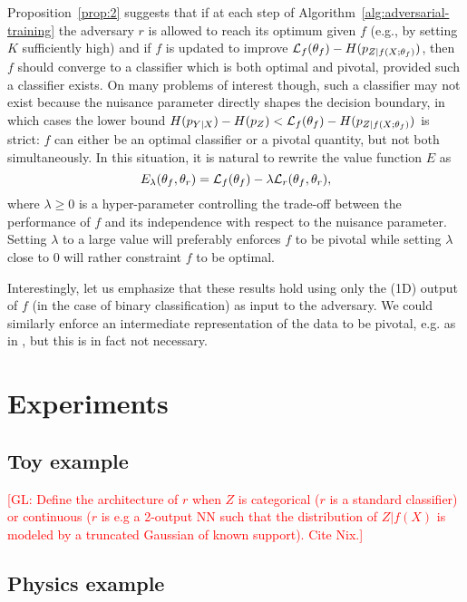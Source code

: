 \documentclass[twocolumn,superscriptaddress,aps]{revtex4-1}
\newcommand{\glnote}[1]{\textcolor{red}{[GL: #1]}}
\theoremstyle{plain}
\begin{document}
Proposition~\ref{prop:2} suggests that if at each step of
Algorithm~\ref{alg:adversarial-training} the adversary $r$ is allowed to reach
its optimum given $f$ (e.g., by setting $K$ sufficiently high) and if $f$ is
updated to improve ${\cal L}_f(\theta_f) - H(p_{Z|f(X;\theta_f)})$, then $f$
should converge to a classifier which is both optimal and pivotal, provided such
a classifier exists. On many problems of interest though, such a classifier may
not exist because the nuisance parameter directly shapes the decision boundary,
in which cases the lower bound $H(p_{Y|X}) - H(p_Z) < {\cal L}_f(\theta_f) -
H(p_{Z|f(X;\theta_f)})$ is strict: $f$ can either be an optimal classifier or a
pivotal quantity, but not both simultaneously. In this situation, it is natural
to rewrite the value function $E$  as
\begin{equation}
    E_\lambda(\theta_f, \theta_r) = {\cal L}_f(\theta_f) - \lambda {\cal L}_r(\theta_f, \theta_r),
\end{equation}
where $\lambda \geq 0$ is a hyper-parameter controlling the trade-off between
the performance of $f$ and its independence with respect to the nuisance
parameter. Setting $\lambda$ to a large value will preferably enforces $f$ to
be pivotal while setting $\lambda$ close to $0$ will rather constraint $f$ to be
optimal.

Interestingly, let us emphasize that these results hold using only the (1D) output
of $f$ (in the case of binary classification) as input to the adversary. We
could similarly enforce an intermediate representation of the data to be
pivotal, e.g. as in \citep{ganin2014unsupervised}, but this is in fact not
necessary.



\section{Experiments}

\subsection{Toy example}

\glnote{Define the architecture of $r$ when $Z$ is categorical ($r$ is a
standard classifier) or continuous ($r$ is e.g a 2-output NN such that the
distribution of $Z|f(X)$ is modeled by a truncated Gaussian of known support). Cite Nix.}

\subsection{Physics example}
\end{document}

